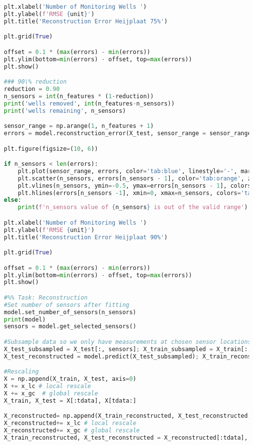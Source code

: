 \begin{lstlisting}[language=Python]
plt.xlabel('Number of Monitoring Wells ')
plt.ylabel(f'RMSE {unit}')
plt.title('Reconstruction Error Heijplaat 75%')

plt.grid(True)

offset = 0.1 * (max(errors) - min(errors))
plt.ylim(bottom=min(errors) - offset, top=max(errors))
plt.show()

### 90\% reduction 
reduction = 0.90
n_sensors = int(n_features * (1-reduction))
print('wells removed', int(n_features-n_sensors))
print('wells remaining', n_sensors)

sensor_range = np.arange(1, n_features + 1)
errors = model.reconstruction_error(X_test, sensor_range = sensor_range)

plt.figure(figsize=(10, 6))

if n_sensors < len(errors): 
    plt.plot(sensor_range, errors, color='tab:blue', linestyle='-', marker='')
    plt.scatter(n_sensors, errors[n_sensors - 1], color='tab:orange', zorder=5)
    plt.vlines(n_sensors, ymin=-0.5, ymax=errors[n_sensors - 1], colors='tab:orange', linestyle='--', linewidth=2.0, label='Selected number of wells')
    plt.hlines(errors[n_sensors -1], xmin=0, xmax=n_sensors, colors='tab:orange', linestyle='--', linewidth=2.0)
else: 
    print(f'n_sensors value of {n_sensors} is out of the valid range')

plt.xlabel('Number of Monitoring Wells ')
plt.ylabel(f'RMSE {unit}')
plt.title('Reconstruction Error Heijplaat 90%')

plt.grid(True)

offset = 0.1 * (max(errors) - min(errors))
plt.ylim(bottom=min(errors) - offset, top=max(errors))
plt.show()

#%% Task: Reconstruction
#Set number of sensors after fitting
model.set_number_of_sensors(n_sensors)
print(model)
sensors = model.get_selected_sensors()

#Subsample data so we only have measurements at chosen sensor locations
X_test_subsampled = X_test[:, sensors]; X_train_subsampled = X_train[:, sensors]
X_test_reconstructed = model.predict(X_test_subsampled); X_train_reconstructed = model.predict(X_train_subsampled)

#Rescaling
X = np.append(X_train, X_test, axis=0)
X += x_lc # local rescale
X += x_gc  # global rescale
X_train, X_test = X[:tdata], X[tdata:]

X_reconstructed= np.append(X_train_reconstructed, X_test_reconstructed, axis=0) # appending in one array
X_reconstructed+= x_lc # local rescale
X_reconstructed+= x_gc # global rescale
X_train_reconstructed, X_test_reconstructed = X_reconstructed[:tdata], X_reconstructed[tdata:] # splitting in train and test set


\end{lstlisting}
